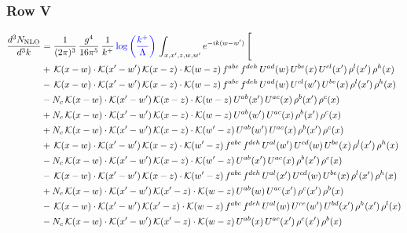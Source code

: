 \documentclass[9pt]{article}
\numberwithin{equation}{section}
\begin{document}
\subsubsection{Row V}
\begin{align}
\frac{d^{3}N_{\mathrm{NLO}}}{d^{3}k} & = \frac{1}{(2\pi)^{3}}\,\frac{g^{4}}{16\pi^{5}}\,\frac{1}{k^{+}}\,{\color{blue}\log{\left(\frac{k^{+}}{\Lambda}\right)}}\,\int_{x,x',z,w,w'}e^{-ik(w-w')}\,\Bigg[\notag\\ &  +\,\mathcal{K}(x-w)\cdot\mathcal{K}(x'-w')\,\mathcal{K}(x-z)\cdot\mathcal{K}(w-z)\,f^{abc}\,f^{deh}\,U^{ad}(w)\,U^{be}(x)\,U^{cl}(x')\,\rho^{l}(x')\,\rho^{h}(x)\notag\\
& -\,\mathcal{K}(x-w)\cdot\mathcal{K}(x'-w')\,\mathcal{K}(x-z)\cdot\mathcal{K}(w-z)\,f^{abc}\,f^{deh}\,U^{ad}(w)\,U^{cl}(w')\,U^{be}(x)\,\rho^{l}(x')\,\rho^{h}(x)\notag\\
& -N_{c}\,\mathcal{K}(x-w)\cdot\mathcal{K}(x'-w')\,\mathcal{K}(x-z)\cdot\mathcal{K}(w-z)\,U^{ab}(x')\,U^{ac}(x)\,\rho^{b}(x')\,\rho^{c}(x)\notag\\
& +N_{c}\,\mathcal{K}(x-w)\cdot\mathcal{K}(x'-w')\,\mathcal{K}(x-z)\cdot\mathcal{K}(w-z)\,U^{ab}(w')\,U^{ac}(x)\,\rho^{b}(x')\,\rho^{c}(x)\notag\\
& +N_{c}\,\mathcal{K}(x-w)\cdot\mathcal{K}(x'-w')\,\mathcal{K}(x-z)\cdot\mathcal{K}(w'-z)\,U^{ab}(w')\,U^{ac}(x)\,\rho^{b}(x')\,\rho^{c}(x)\notag\\
& +\,\mathcal{K}(x-w)\cdot\mathcal{K}(x'-w')\,\mathcal{K}(x-z)\cdot\mathcal{K}(w'-z)\,f^{abc}\,f^{deh}\,U^{al}(w')\,U^{cd}(w)\,U^{be}(x)\,\rho^{l}(x')\,\rho^{h}(x)\notag\\
& -N_{c}\,\mathcal{K}(x-w)\cdot\mathcal{K}(x'-w')\,\mathcal{K}(x-z)\cdot\mathcal{K}(w'-z)\,U^{ab}(x')\,U^{ac}(x)\,\rho^{b}(x')\,\rho^{c}(x)\notag\\
& -\,\mathcal{K}(x-w)\cdot\mathcal{K}(x'-w')\,\mathcal{K}(x-z)\cdot\mathcal{K}(w'-z)\,f^{abc}\,f^{deh}\,U^{al}(x')\,U^{cd}(w)\,U^{be}(x)\,\rho^{l}(x')\,\rho^{h}(x)\notag\\
& +N_{c}\,\mathcal{K}(x-w)\cdot\mathcal{K}(x'-w')\,\mathcal{K}(x'-z)\cdot\mathcal{K}(w-z)\,U^{ab}(w)\,U^{ac}(x')\,\rho^{c}(x')\,\rho^{b}(x)\notag\\
& -\,\mathcal{K}(x-w)\cdot\mathcal{K}(x'-w')\,\mathcal{K}(x'-z)\cdot\mathcal{K}(w-z)\,f^{abc}\,f^{deh}\,U^{al}(w)\,U^{ce}(w')\,U^{bd}(x')\,\rho^{h}(x')\,\rho^{l}(x)\notag\\
& -N_{c}\,\mathcal{K}(x-w)\cdot\mathcal{K}(x'-w')\,\mathcal{K}(x'-z)\cdot\mathcal{K}(w-z)\,U^{ab}(x)\,U^{ac}(x')\,\rho^{c}(x')\,\rho^{b}(x)\notag\\

\end{align}
\end{document}
